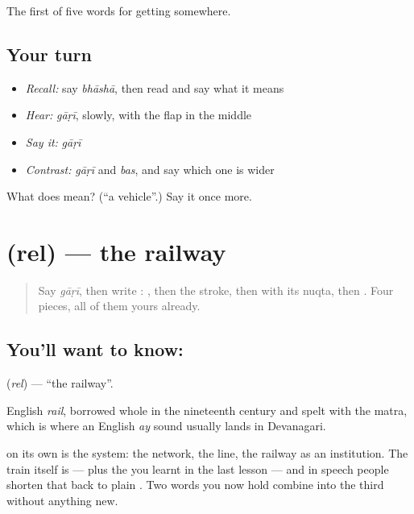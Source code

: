 \begin{grammarlens}[title={What you've built}]
The first of five words for getting somewhere.
\end{grammarlens}

\subsection*{Your turn}
\begin{itemize}
\raggedright
  \item \emph{Recall:} say \emph{bhāshā}, then read \textbf{} and say what it means
  \item \emph{Hear:} \emph{gāṛī}, slowly, with the flap in the middle
  \item \emph{Say it:} \emph{gāṛī}
  \item \emph{Contrast:} \emph{gāṛī} and \emph{bas}, and say which one is wider
\end{itemize}

\begin{tcolorbox}[breakable,colback=teal!4,colframe=teal!35!black,title={Before you move on}]
What does  mean? (\textquotedblleft{}a vehicle\textquotedblright{}.) Say it once more.
\end{tcolorbox}
\section[rel]{ (rel) — the railway}

\label{lesson:HI-C69-railway}



\begin{quote}
Say \emph{gāṛī}, then write \textbf{}: , then the  stroke, then  with its nuqta, then . Four pieces, all of them yours already.
\end{quote}

\subsection*{You'll want to know: }
\textbf{} (\emph{rel}) — \textquotedblleft{}the railway\textquotedblright{}.

English \emph{rail}, borrowed whole in the nineteenth century and spelt with the  matra, which is where an English \emph{ay} sound usually lands in Devanagari.

 on its own is the system: the network, the line, the railway as an institution. The train itself is \textbf{} —  plus the  you learnt in the last lesson — and in speech people shorten that back to plain . Two words you now hold combine into the third without anything new.

